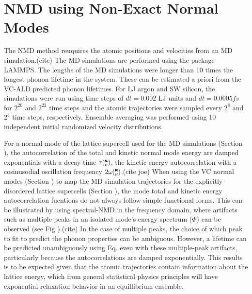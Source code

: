 \documentclass[aps,prb,twocolumn,superscriptaddress,amsmath,amssymb,floatfix]{revtex4}
\newcommand{\kv}{\mspace{-4.0mu}\left(\mspace{-8.0mu}
\begin{smallmatrix}&\pmb{\kappa} \\&\nu\end{smallmatrix}
\mspace{-3.0mu}\right)}
\begin{document}

\section{\label{A:NMD XCORR}
NMD using Non-Exact Normal Modes}

The NMD method reuquires the atomic positions and velocities  
from an MD simulation.(cite) 
The MD simulations are performed using the package LAMMPS.
\cite{plimpton_fast_1995} The lengths of the MD simulations were longer 
than 10 times the longest phonon lifetime in the system. These can 
be estimated a priori from the VC-ALD predicted phonon lifetimes. For LJ 
argon and SW silicon, the simulations were run using time steps of 
$dt=0.002$ LJ units and $dt = 0.0005 fs$ for $2^20$ and 
$2^22$ time steps and the atomic trajectories were sampled 
every $2^8$ and $2^4$ time steps, respectively. 
Ensemble averaging was performed using 10 independent initial 
randomized velocity distributions. 

For a normal mode of the lattice supercell 
used for the MD simulations (Section ), 
the autocorrelation of the total and kinetic     
normal mode energy are damped exponentials 
with a decay time $\tau\kv$, the kinetic energy autocorrelation with a 
cosinusodial oscillation frequency 
$2\omega\kv$.(cite joe) 
When using the VC normal modes (Section ) to map the MD simulation 
trajectories for the explicitly disordered lattice supercells (Section ), 
the mode total and kinetic energy autocorrelation fucntions 
do not always follow simple functional forms. 
This can be illustrated by using spectral-NMD 
in the frequency domain, where artifacts such as 
multiple peaks in an isolated mode's 
energy spectrum ($\Phi$) can be observed (see Fig ).(cite)  
In the case 
of multiple peaks, the choice of which peak to fit to predict the phonon 
properties can be ambiguous.  However, 
a lifetime can be predicted unambiguously using Eq. even with 
these multiple-peak artifacts, particularly because the autocorrelations 
are damped exponentially. This results is to be expected 
given that the atomic trajectories contain 
information about the lattice energy, which from general statistical 
physics principles will have exponential relaxation behavior in an 
equillibrium ensemble.
\cite{srivastava_physics_1990,landau_statistical_1980,
rajabpour_thermal_2010}
\end{document}
